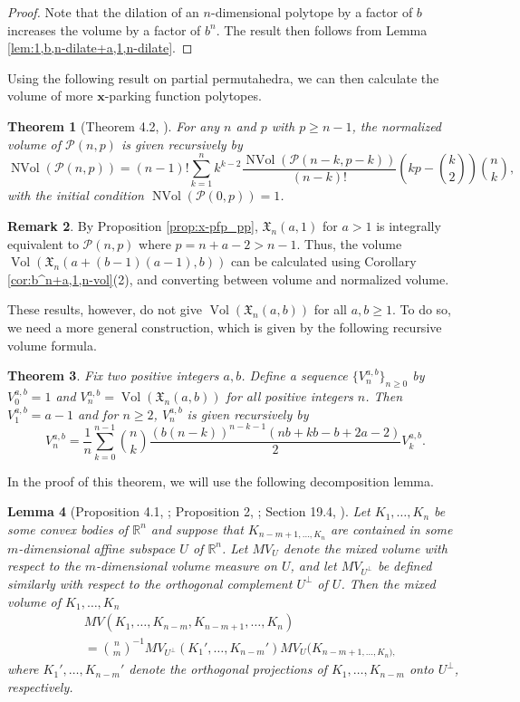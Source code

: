\documentclass[11pt]{amsart}
\newtheorem{theorem}{Theorem}[section]
\newtheorem{lemma}[theorem]{Lemma}
\theoremstyle{definition}
\newtheorem{remark}[theorem]{Remark}
\newcommand{\0}{\emptyset}
\newcommand{\R}{\mathbb{R}}
\newcommand{\Xn}{\mathfrak{X}_{n}(a,b)}
\DeclareMathOperator{\Vol}{Vol}
\DeclareMathOperator{\nVol}{NVol}
\begin{document}
\begin{proof}
Note that the dilation of an $n$-dimensional polytope by a factor of $b$ increases the volume by a factor of $b^n$. The result then follows from Lemma \ref{lem:1,b,n-dilate+a,1,n-dilate}.
\end{proof}

Using the following result on partial permutahedra, we can then calculate the volume of more $\mathbf{x}$-parking function polytopes.
\begin{theorem}[Theorem 4.2, \cite{BCC}]
For any $n$ and $p$ with $p \geq n-1$, the normalized volume of $\mathcal{P}(n,p)$ is given recursively by
\[ \nVol(\mathcal{P}(n,p)) = (n-1)! \sum_{k=1}^n k^{k-2} \frac{\nVol(\mathcal{P}(n-k,p-k))}{(n-k)!}\left(kp-\binom{k}{2}\right) \binom{n}{k},\]
with the initial condition $\nVol(\mathcal{P}(0,p))=1$.
\end{theorem}

\begin{remark}
By Proposition \ref{prop:x-pfp_pp}, $\mathfrak{X}_{n}(a,1)$ for $a>1$ is integrally equivalent to $\mathcal{P}(n,p)$ where $p = n + a - 2 >n-1$. 
Thus, the volume $\Vol(\mathfrak{X}_{n}(a+ (b-1)(a-1),b))$ can be calculated using Corollary \ref{cor:b^n+a,1,n-vol}(2), and converting between volume and normalized volume.
\end{remark}

These results, however, do not give $\Vol(\Xn)$ for all $a,b \geq 1$. 
To do so, we need a more general construction, which is given by the following recursive volume formula.

\begin{theorem}\label{thm:generalized_recursive_volume}
Fix two positive integers $a,b$.
Define a sequence $\{V_n^{a,b}\}_{n \geq 0}$ by $V^{a,b}_0=1$ and $V^{a,b}_n = \Vol(\Xn)$ for all positive integers $n$.
Then $V^{a,b}_1 = a-1$ and for $n \geq 2$, $V^{a,b}_n$ is given recursively by 
\[ V_n^{a,b} = \frac{1}{n}\sum_{k=0}^{n-1}\binom{n}{k} \frac{(b(n-k))^{n-k-1}(nb+kb-b+2a-2)}{2}V^{a,b}_{k}.\]
\end{theorem}

In the proof of this theorem, we will use the following decomposition lemma.

\begin{lemma}[Proposition 4.1, \cite{AW}; Proposition 2, \cite{DGH}; Section 19.4, \cite{BZ}]\label{lem:decomp}
Let $K_1, \ldots, K_n$ be some convex bodies of $\R^n$ and suppose that $K_{n-m+1, \ldots, K_n}$ are contained in some $m$-dimensional affine subspace $U$ of $\R^n$. 
Let $MV_U$ denote the mixed volume with respect to the $m$-dimensional volume measure on $U$, and let $MV_{U^\perp}$ be defined similarly with respect to the orthogonal complement $U^\perp$ of $U$.
Then the mixed volume of $K_1, \ldots, K_n$
\begin{align*}
    &MV(K_1, \ldots, K_{n-m}, K_{n-m+1}, \ldots, K_n)\\
    &= \binom{n}{m}^{-1} MV_{U^\perp} (K_1', \ldots, K_{n-m}')MV_U(K_{n-m+1, \ldots, K_n),}
\end{align*}
where $K_1', \ldots, K_{n-m}'$ denote the orthogonal projections of $K_1, \ldots, K_{n-m}$ onto $U^\perp$, respectively.
\end{lemma}
\end{document}
